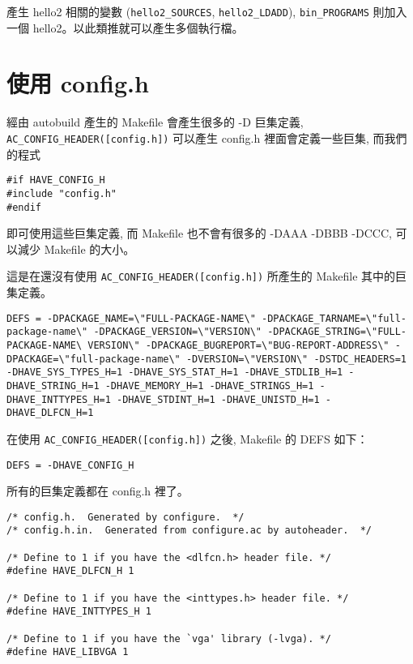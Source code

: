 \documentclass[12pt,a4]{article}
\begin{document}
\begin{CJK}{UTF8}{bsmi}
產生 hello2 相關的變數 (\verb+hello2_SOURCES+, \verb+hello2_LDADD+), \verb+bin_PROGRAMS+ 則加入一個 hello2。以此類推就可以產生多個執行檔。


\section{使用 config.h}


經由 autobuild 產生的 Makefile 會產生很多的 -D 巨集定義,
\verb+AC_CONFIG_HEADER([config.h])+
可以產生 config.h 裡面會定義一些巨集,
而我們的程式


\begin{verbatim}
#if HAVE_CONFIG_H
#include "config.h"
#endif
\end{verbatim}

即可使用這些巨集定義,
而 Makefile 也不會有很多的 -DAAA -DBBB -DCCC,
可以減少 Makefile 的大小。


這是在還沒有使用
\verb+AC_CONFIG_HEADER([config.h])+
所產生的 Makefile 其中的巨集定義。

\begin{verbatim}
DEFS = -DPACKAGE_NAME=\"FULL-PACKAGE-NAME\" -DPACKAGE_TARNAME=\"full-package-name\" -DPACKAGE_VERSION=\"VERSION\" -DPACKAGE_STRING=\"FULL-PACKAGE-NAME\ VERSION\" -DPACKAGE_BUGREPORT=\"BUG-REPORT-ADDRESS\" -DPACKAGE=\"full-package-name\" -DVERSION=\"VERSION\" -DSTDC_HEADERS=1 -DHAVE_SYS_TYPES_H=1 -DHAVE_SYS_STAT_H=1 -DHAVE_STDLIB_H=1 -DHAVE_STRING_H=1 -DHAVE_MEMORY_H=1 -DHAVE_STRINGS_H=1 -DHAVE_INTTYPES_H=1 -DHAVE_STDINT_H=1 -DHAVE_UNISTD_H=1 -DHAVE_DLFCN_H=1
\end{verbatim}

在使用
\verb+AC_CONFIG_HEADER([config.h])+
之後, Makefile 的 DEFS 如下：

\begin{verbatim}
DEFS = -DHAVE_CONFIG_H
\end{verbatim}

所有的巨集定義都在 config.h 裡了。


\begin{verbatim}
/* config.h.  Generated by configure.  */
/* config.h.in.  Generated from configure.ac by autoheader.  */

/* Define to 1 if you have the <dlfcn.h> header file. */
#define HAVE_DLFCN_H 1

/* Define to 1 if you have the <inttypes.h> header file. */
#define HAVE_INTTYPES_H 1

/* Define to 1 if you have the `vga' library (-lvga). */
#define HAVE_LIBVGA 1


\end{verbatim}
\end{CJK}
\end{document}
